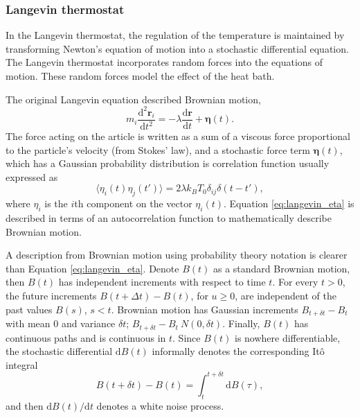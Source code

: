 \subsubsection{Langevin thermostat}

In the Langevin thermostat\cite{allen1987_md}, the regulation of the temperature is maintained by transforming Newton's equation of motion into a stochastic differential equation.
The Langevin thermostat incorporates random forces into the equations of motion.  These random forces model the effect of the heat bath.

The original Langevin equation\cite{langevin1908_equation} described Brownian motion,
\begin{equation}
  \label{eq:langevin}
  m_i \frac{\mathrm{d}^2 \bm{r}_i}
	         {\mathrm{d} t^2}
  =
  - \lambda
	  \frac{\mathrm{d} \bm{r}}
	       {\mathrm{d} t}
	+ \bm{\eta}(t).
\end{equation}
The force acting on the article is written as a sum of a viscous force proportional to the particle's velocity (from Stokes' law), and a stochastic force term $\bm{\eta}(t)$, which has a Gaussian probability distribution is correlation function usually expressed as
\begin{equation}
  \label{eq:langevin_eta}
  \langle \eta_i(t) \eta_j(t') \rangle = 2 \lambda k_B T_0 \delta_{ij} \delta(t-t'),
\end{equation}
where $\eta_i$ is the $i$th component on the vector $\eta_i(t)$.  Equation \ref{eq:langevin_eta} is described in terms of an autocorrelation function to mathematically describe Brownian motion.

A description from Brownian motion using probability theory notation\cite{karatzas1991_sde} is clearer than Equation \ref{eq:langevin_eta}. Denote $B(t)$ as a standard Brownian motion, then $B(t)$ has independent increments with respect to time $t$.  For every $t > 0$, the future increments $B(t+\Delta t) - B(t)$, for $u \geq 0$, are independent of the past values $B(s)$, $s < t$.  Brownian motion has Gaussian increments $B_{t+\delta t}-B_{t}$ with mean $0$ and variance $\delta t$; $B_{t+\delta t}-B_{t}~N(0,\delta t)$.
Finally, $B(t)$ has continuous paths and is continuous in $t$.
Since $B(t)$ is nowhere differentiable, the stochastic differential $\mathrm{d}B(t)$ informally denotes the corresponding It\^{o} integral
\begin{equation}
  B(t+\delta t) - B(t)
	=
	\int_t^{t+\delta{t}} \!\!\! \mathrm{d}B(\tau),
\end{equation}
and then $\mathrm{d} B(t)/\mathrm{d}t$ denotes a white noise process.

